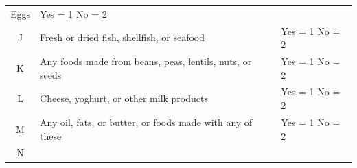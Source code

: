 \documentclass[12pt,]{book}
\theoremstyle{definition}
\theoremstyle{definition}
\theoremstyle{definition}
\theoremstyle{remark}
\begin{document}
\begin{longtable}[]{@{}cll@{}}
\begin{minipage}[t]{0.68\columnwidth}
Eggs\strut
\end{minipage} & \begin{minipage}[t]{0.18\columnwidth}\raggedright
Yes = 1 No = 2\strut
\end{minipage}\tabularnewline
\begin{minipage}[t]{0.06\columnwidth}\centering
J\strut
\end{minipage} & \begin{minipage}[t]{0.68\columnwidth}\raggedright
Fresh or dried fish, shellfish, or seafood\strut
\end{minipage} & \begin{minipage}[t]{0.18\columnwidth}\raggedright
Yes = 1 No = 2\strut
\end{minipage}\tabularnewline
\begin{minipage}[t]{0.06\columnwidth}\centering
K\strut
\end{minipage} & \begin{minipage}[t]{0.68\columnwidth}\raggedright
Any foods made from beans, peas, lentils, nuts, or seeds\strut
\end{minipage} & \begin{minipage}[t]{0.18\columnwidth}\raggedright
Yes = 1 No = 2\strut
\end{minipage}\tabularnewline
\begin{minipage}[t]{0.32\columnwidth}\centering
L\strut
\end{minipage} & \begin{minipage}[t]{0.32\columnwidth}\raggedright
Cheese, yoghurt, or other milk products\strut
\end{minipage} & \begin{minipage}[t]{0.32\columnwidth}\raggedright
Yes = 1 No = 2\strut
\end{minipage}\tabularnewline
\begin{minipage}[t]{0.06\columnwidth}\centering
M\strut
\end{minipage} & \begin{minipage}[t]{0.68\columnwidth}\raggedright
Any oil, fats, or butter, or foods made with any of these\strut
\end{minipage} & \begin{minipage}[t]{0.18\columnwidth}\raggedright
Yes = 1 No = 2\strut
\end{minipage}\tabularnewline
\begin{minipage}[t]{0.06\columnwidth}\centering
N\strut
\end{minipage} & \begin{minipage}[t]{0.68\columnwidth}\raggedright

\end{minipage}
\end{longtable}
\end{document}
